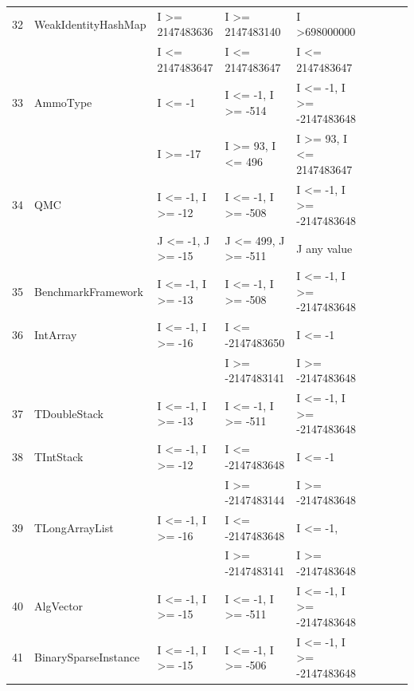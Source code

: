 \documentclass[runningheads,a4paper]{llncs}
\begin{document}
\begin{table}[h]
{{\begin{tabular}{|l|l|l|l|l|l|l|l|l|}
32	& WeakIdentityHashMap		& I \textgreater= 2147483636				& I \textgreater= 2147483140			& I \textgreater 698000000					\\ 
	&                                             & I \textless= 2147483647					& I \textless= 2147483647				& I \textless= 2147483647					\\
33	& AmmoType				& I \textless= -1								& I \textless= -1, I \textgreater= -514		& I \textless= -1, I \textgreater= -2147483648	\\ 			
	&                                             & I \textgreater= -17							& I \textgreater= 93, I \textless= 496		& I \textgreater= 93, 	I \textless= 2147483647	\\
34	& QMC						& I \textless= -1, I \textgreater= -12			& I \textless= -1, I \textgreater= -508		& I \textless= -1, I \textgreater= -2147483648	\\ 
	&                                             & J \textless= -1, J \textgreater= -15			& J \textless= 499, J \textgreater= -511	& J any value			 		  				\\	
35	& BenchmarkFramework		& I \textless= -1, I \textgreater= -13			& I \textless= -1, I \textgreater= -508		& I \textless= -1, I \textgreater= -2147483648	\\ 
36	& IntArray					& I \textless= -1, I \textgreater= -16			& I \textless= -2147483650				& I \textless= -1								\\ 
	&							&											& I \textgreater= -2147483141			&  I \textgreater= -2147483648				\\
37	& TDoubleStack				& I \textless= -1, I \textgreater= -13			& I \textless= -1, I \textgreater= -511		& I \textless= -1, I \textgreater= -2147483648	\\ 
38	& TIntStack					& I \textless= -1, I \textgreater= -12			& I \textless= -2147483648		 		& I \textless= -1 							\\ 
	&							&											& I \textgreater= -2147483144			& I \textgreater= -2147483648				\\
39	& TLongArrayList				& I \textless= -1, I \textgreater= -16			& I \textless= -2147483648 				& I \textless= -1, 							\\ 
	&							&											& I \textgreater= -2147483141			& I \textgreater= -2147483648				\\
40	& AlgVector					& I \textless= -1, I \textgreater= -15			& I \textless= -1, I \textgreater= -511		& I \textless= -1, I \textgreater= -2147483648	\\ 
41	& BinarySparseInstance		& I \textless= -1, I \textgreater= -15			& I \textless= -1, I \textgreater= -506		& I \textless= -1, I \textgreater= -2147483648	\\ 

\end{tabular}}}
\end{table}
\end{document}
